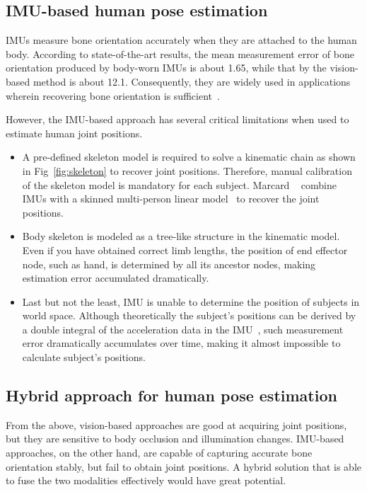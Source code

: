 \documentclass[10pt,twocolumn,letterpaper]{article}
\begin{document}
\subsection{IMU-based human pose estimation}
\label{sec:imu}
IMUs measure bone orientation accurately when they are attached to the human body. According to state-of-the-art results, the mean measurement error of bone orientation produced by body-worn IMUs is about 1.65\degree \cite{paulichxsens}, while that by the vision-based method is about 12.1\degree \cite{von2018recovering}. Consequently, they are widely used in applications wherein recovering bone orientation is sufficient~\cite{Vlasic07,paulichxsens,Tautges11,Slyper08}.

However, the IMU-based approach has several critical limitations when used to estimate human joint positions.
\begin{itemize}
    \item A pre-defined skeleton model is required to solve a kinematic chain as shown in Fig~\ref{fig:skeleton} to recover joint positions. Therefore, manual calibration of the skeleton model is mandatory for each subject. Marcard \etal~\cite{von2017sparse} combine IMUs with a skinned multi-person linear model~\cite{loper2015smpl} to recover the joint positions.
    \item Body skeleton is modeled as a tree-like structure in the kinematic model. Even if you have obtained correct limb lengths, the position of end effector node, such as hand, is determined by all its ancestor nodes, making estimation error accumulated dramatically.
    \item Last but not the least, IMU is unable to determine the position of subjects in world space. Although theoretically the subject's positions can be derived by a double integral of the acceleration data in the IMU~\cite{Tautges11,Slyper08}, such measurement error dramatically accumulates over time, making it almost impossible to calculate subject's positions.
\end{itemize}

\subsection{Hybrid approach for human pose estimation}

From the above, vision-based approaches are good at acquiring joint positions, but they are sensitive to body occlusion and illumination changes. IMU-based approaches, on the other hand, are capable of capturing accurate bone orientation stably, but fail to obtain joint positions. A hybrid solution that is able to fuse the two modalities effectively would have great potential.
\end{document}
